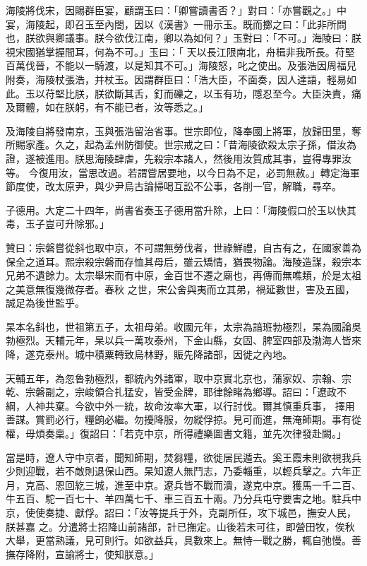\begin{pinyinscope}
 海陵將伐宋，因賜群臣宴，顧謂玉曰：「卿嘗讀書否？」對曰：「亦嘗觀之。」中宴，海陵起，即召玉至內閤，因以《漢書》一冊示玉。既而擲之曰：「此非所問也，朕欲與卿議事。朕今欲伐江南，卿以為如何？」玉對曰：「不可。」海陵曰：朕視宋國猶掌握間耳，何為不可。」玉曰：「
 天以長江限南北，舟楫非我所長。苻堅百萬伐晉，不能以一騎渡，以是知其不可。」海陵怒，叱之使出。及張浩因周福兒附奏，海陵杖張浩，并杖玉。因謂群臣曰：「浩大臣，不面奏，因人達語，輕易如此。玉以苻堅比朕，朕欲斷其舌，釘而礫之，以玉有功，隱忍至今。大臣決責，痛及爾體，如在朕躬，有不能已者，汝等悉之。」



 及海陵自將發南京，玉與張浩留治省事。世宗即位，降奉國上將軍，放歸田里，奪所賜家產。久之，起為孟州防御使。世宗戒之曰：「昔海陵欲殺太宗子孫，借汝為證，遂被進用。朕思海陵肆虐，先殺宗本諸人，然後用汝質成其事，豈得專罪汝等。
 今復用汝，當思改過。若謂嘗居要地，以今日為不足，必罰無赦。」轉定海軍節度使，改太原尹，與少尹烏古論掃喝互訟不公事，各削一官，解職，尋卒。



 子德用。大定二十四年，尚書省奏玉子德用當升除，上曰：「海陵假口於玉以快其毒，玉子豈可升除邪。」



 贊曰：宗磐嘗從斜也取中京，不可謂無勞伐者，世祿鮮禮，自古有之，在國家善為保全之道耳。熙宗殺宗磐而存恤其母后，雖云矯情，猶畏物論。海陵造謀，殺宗本兄弟不遺餘力。太宗舉宋而有中原，金百世不遷之廟也，再傳而無噍類，於是太祖之美意無復幾微存者。春秋
 之世，宋公舍與夷而立其弟，禍延數世，害及五國，誠足為後世監乎。



 杲本名斜也，世祖第五子，太祖母弟。收國元年，太宗為諳班勃極烈，杲為國論吳勃極烈。天輔元年，杲以兵一萬攻泰州，下金山縣，女固、脾室四部及渤海人皆來降，遂克泰州。城中積粟轉致烏林野，賑先降諸部，因徙之內地。



 天輔五年，為忽魯勃極烈，都統內外諸軍，取中京實北京也，蒲家奴、宗翰、宗乾、宗磐副之，宗峻領合扎猛安，皆受金牌，耶律餘睹為鄉導。詔曰：「遼政不綱，人神共棄。今欲中外一統，故命汝率大軍，以行討伐。爾其慎重兵事，
 擇用善謀。賞罰必行，糧餉必繼。勿擾降服，勿縱俘掠。見可而進，無淹師期。事有從權，毋煩奏稟。」復詔曰：「若克中京，所得禮樂圖書文籍，並先次律發赴闕。」



 當是時，遼人守中京者，聞知師期，焚芻糧，欲徙居民遁去。奚王霞未則欲視我兵少則迎戰，若不敵則退保山西。杲知遼人無鬥志，乃委輜重，以輕兵擊之。六年正月，克高、恩回紇三城，進至中京。遼兵皆不戰而潰，遂克中京。獲馬一千二百、牛五百、駝一百七十、羊四萬七千、車三百五十兩。乃分兵屯守要害之地。駐兵中京，使使奏捷、獻俘。詔曰：「汝等提兵于外，克副所任，攻下城邑，撫安人民，朕甚嘉
 之。分遣將士招降山前諸部，計已撫定。山後若未可往，即營田牧，俟秋大舉，更當熟議，見可則行。如欲益兵，具數來上。無恃一戰之勝，輒自弛慢。善撫存降附，宣諭將士，使知朕意。」




\end{pinyinscope}
